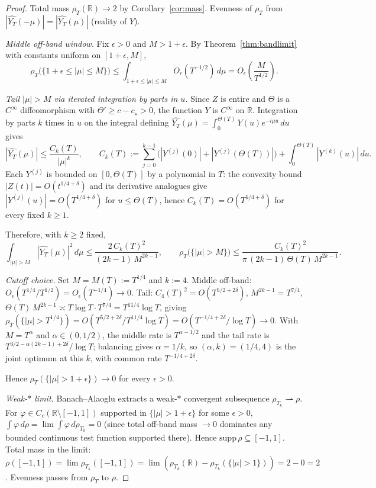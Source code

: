 \documentclass[11pt]{article}
\theoremstyle{definition}
\newcommand{\R}{\mathbb{R}}
\begin{document}
\begin{proof}
Total mass $\rho_T(\R) \to 2$ by Corollary~\ref{cor:mass}. Evenness of $\rho_T$ from $|\widehat{Y_T}(-\mu)| = |\widehat{Y_T}(\mu)|$ (reality of $Y$).

\emph{Middle off-band window.} Fix $\epsilon > 0$ and $M > 1+\epsilon$. By Theorem~\ref{thm:bandlimit} with constants uniform on $[1+\epsilon, M]$,
\[
\rho_T\big(\{1+\epsilon \leq |\mu| \leq M\}\big) \leq \int_{1+\epsilon \leq |\mu| \leq M} O_\epsilon(T^{-1/2})\, d\mu = O_\epsilon\!\left(\frac{M}{T^{1/2}}\right).
\]

\emph{Tail $|\mu| > M$ via iterated integration by parts in $u$.} Since $Z$ is entire and $\Theta$ is a $C^\infty$ diffeomorphism with $\Theta' \geq c - c_\star > 0$, the function $Y$ is $C^\infty$ on $\R$. Integration by parts $k$ times in $u$ on the integral defining $\widehat{Y_T}(\mu) = \int_0^{\Theta(T)} Y(u) e^{-i\mu u}\,du$ gives
\[
|\widehat{Y_T}(\mu)| \leq \frac{C_k(T)}{|\mu|^k}, \qquad C_k(T) := \sum_{j=0}^{k-1}\big(|Y^{(j)}(0)| + |Y^{(j)}(\Theta(T))|\big) + \int_0^{\Theta(T)} |Y^{(k)}(u)|\, du.
\]
Each $Y^{(j)}$ is bounded on $[0, \Theta(T)]$ by a polynomial in $T$: the convexity bound $|Z(t)| = O(t^{1/4+\delta})$ and its derivative analogues give $|Y^{(j)}(u)| = O(T^{1/4+\delta})$ for $u \leq \Theta(T)$, hence $C_k(T) = O(T^{5/4 + \delta})$ for every fixed $k \geq 1$.

Therefore, with $k \geq 2$ fixed,
\[
\int_{|\mu| > M} |\widehat{Y_T}(\mu)|^2\, d\mu \leq \frac{2\, C_k(T)^2}{(2k-1)\, M^{2k-1}}, \qquad \rho_T\big(\{|\mu| > M\}\big) \leq \frac{C_k(T)^2}{\pi\,(2k-1)\,\Theta(T)\, M^{2k-1}}.
\]

\emph{Cutoff choice.} Set $M = M(T) := T^{1/4}$ and $k := 4$. Middle off-band: $O_\epsilon(T^{1/4}/T^{1/2}) = O_\epsilon(T^{-1/4}) \to 0$. Tail: $C_4(T)^2 = O(T^{5/2 + 2\delta})$, $M^{2k-1} = T^{7/4}$, $\Theta(T)\,M^{2k-1} \asymp T \log T \cdot T^{7/4} = T^{11/4}\log T$, giving $\rho_T(\{|\mu| > T^{1/4}\}) = O(T^{5/2 + 2\delta}/T^{11/4}\log T) = O(T^{-1/4 + 2\delta}/\log T) \to 0$. With $M = T^\alpha$ and $\alpha \in (0, 1/2)$, the middle rate is $T^{\alpha - 1/2}$ and the tail rate is $T^{3/2 - \alpha(2k-1) + 2\delta}/\log T$; balancing gives $\alpha = 1/k$, so $(\alpha, k) = (1/4, 4)$ is the joint optimum at this $k$, with common rate $T^{-1/4 + 2\delta}$.

Hence $\rho_T(\{|\mu| > 1 + \epsilon\}) \to 0$ for every $\epsilon > 0$.

\emph{Weak-$*$ limit.} Banach--Alaoglu extracts a weak-$*$ convergent subsequence $\rho_{T_k} \rightharpoonup \rho$. For $\varphi \in C_c(\R \setminus [-1,1])$ supported in $\{|\mu| > 1 + \epsilon\}$ for some $\epsilon > 0$, $\int\varphi\, d\rho = \lim \int\varphi\, d\rho_{T_k} = 0$ (since total off-band mass $\to 0$ dominates any bounded continuous test function supported there). Hence $\mathrm{supp}\,\rho \subseteq [-1,1]$. Total mass in the limit: $\rho([-1,1]) = \lim\rho_{T_k}([-1,1]) = \lim(\rho_{T_k}(\R) - \rho_{T_k}(\{|\mu|>1\})) = 2 - 0 = 2$. Evenness passes from $\rho_T$ to $\rho$.
\end{proof}
\end{document}
